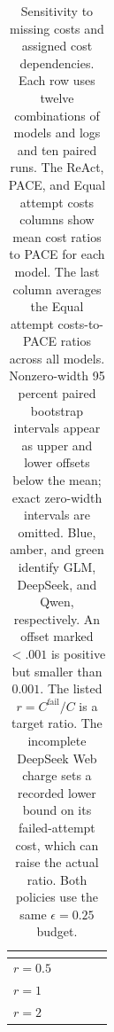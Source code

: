 \begin{table}[htbp]
\centering
\caption{Sensitivity to missing costs and assigned cost dependencies.
Each row uses twelve combinations of models and logs and ten paired runs.
The ReAct, PACE, and Equal attempt costs columns show mean cost ratios to PACE for each model.
The last column averages the Equal attempt costs-to-PACE ratios across all models.
Nonzero-width 95 percent paired bootstrap intervals appear as upper and lower offsets below the mean; exact zero-width intervals are omitted.
Blue, amber, and green identify GLM, DeepSeek, and Qwen, respectively.
An offset marked $<.001$ is positive but smaller than $0.001$.
The listed $r=C^{\mathrm{fail}}/C$ is a target ratio.
The incomplete DeepSeek Web charge sets a recorded lower bound on its failed-attempt cost, which can raise the actual ratio.
Both policies use the same $\epsilon=0.25$ budget.}
\label{tab:missing-cost-sensitivity}
\tablefont
\setlength{\tabcolsep}{2pt}
\renewcommand{\arraystretch}{0.95}
\begin{tabular}{@{}lrrrr@{}}
\toprule
{} &  &  &  &  \\
\midrule
$r=0.5$ &  &  &  &  \\
$r=1$ &  &  &  &  \\
$r=2$ &  &  &  &  \\

\end{tabular}
\end{table}
